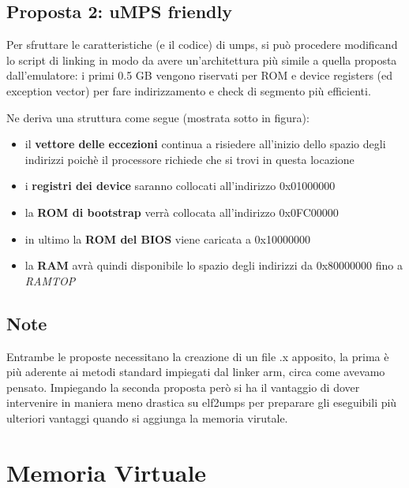 \documentclass[a4paper,12pt]{article}
\begin{document}
\clearpage

\subsection{Proposta 2: uMPS friendly}

Per sfruttare le caratteristiche (e il codice) di umps, si pu\`o procedere modificand lo script di linking in modo da avere un'architettura pi\`u simile a quella proposta dall'emulatore: i primi 0.5 GB vengono riservati per ROM e device registers (ed exception vector) per fare indirizzamento e check di segmento pi\`u efficienti.

Ne deriva una struttura come segue (mostrata sotto in figura):
\begin{itemize}
\item il \textbf{vettore delle eccezioni} continua a risiedere all'inizio dello spazio degli indirizzi poich\`e il processore richiede che si trovi in questa locazione
\item i \textbf{registri dei device} saranno collocati all'indirizzo 0x01000000
\item la \textbf{ROM di bootstrap} verr\`a collocata all'indirizzo 0x0FC00000
\item in ultimo la \textbf{ROM del BIOS} viene caricata a 0x10000000
\item la \textbf{RAM} avr\`a quindi disponibile lo spazio degli indirizzi da 0x80000000 fino a \emph{RAMTOP}
\end{itemize}

\begin{figure}
\def\svgwidth{\columnwidth}

\end{figure}

\clearpage

\subsection{Note}

Entrambe le proposte necessitano la creazione di un file .x apposito, la prima \`e pi\`u aderente ai metodi standard impiegati dal linker arm, circa come avevamo pensato. Impiegando la seconda proposta per\`o si ha il vantaggio di dover intervenire in maniera meno drastica su elf2umps per preparare gli eseguibili pi\`u ulteriori vantaggi quando si aggiunga la memoria virutale.

\section{Memoria Virtuale}
\end{document}
